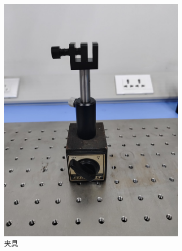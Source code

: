 \documentclass[a4paper]{report} %
\begin{document}
\begin{figure}[htbp]
\begin{subfigure}{0.22\textwidth}
        \includegraphics[width=\linewidth]{夹具1.jpg}
        \caption{夹具}
    \end{subfigure}
    \begin{subfigure}{0.22\textwidth}

\end{subfigure}
\end{figure}
\end{document}
